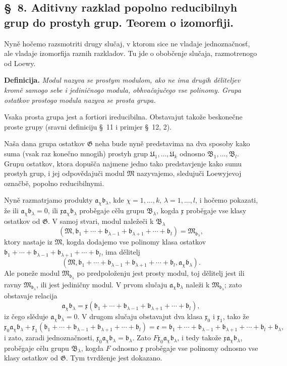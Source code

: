 \documentclass[11pt]{article}
\providecommand{\mM}{\mathfrak M}
\providecommand{\mG}{\mathfrak G}
\providecommand{\mU}{\mathfrak U}
\providecommand{\mB}{\mathfrak B}
\providecommand{\ma}{\mathfrak a}
\providecommand{\mb}{\mathfrak b}
\providecommand{\me}{\mathfrak e}
\providecommand{\mx}{\mathfrak x}
\begin{document}

\setcounter{footnote}{16}
\subsection*{\S~8. Aditivny razklad popolno reducibilnyh grup do prostyh grup. Teorem o izomorfiji.}

Nyně hočemo razsmotriti drugy slučaj, v ktorom sice ne vladaje jednoznačnosť, ale vladaje izomorfija raznih razkladov. Tu jde o obobčenje slučaja, razmotrenogo od Loewy.

\textbf{Definicija.} \textit{Modul nazyva se prostym modulom, ako ne ima drugih děliteljev kromě samogo sebe i jediničnogo modula, obhvačajučego vse polinomy. Grupa ostatkov prostogo modula nazyva se prosta grupa.}

Vsaka prosta grupa jest a fortiori ireducibilna. Obstavajut takože beskonečne proste grupy (sravni definiciju \S~11 i primjer \S~12, 2).

Naša dana grupa ostatkov \(\mG\) neha bude nyně predstavima na dva sposoby kako suma (vsak raz konečno mnogih) prostyh grup \(\mU_1,\ldots,\mU_k\) odnosno \(\mB_1,\ldots,\mB_l\). Grupu ostatkov, ktora dopušča najmene jedno tako predstavjenje kako sumu prostyh grup, i jej odpovědajuči modul \(\mM\) nazyvajemo, sledujuči Loewyjevoj označbě, popolno reducibilnymi.

Nyně razmatrjamo produkty \(\ma_\chi\mb_\lambda\), kde \(\chi=1,\ldots,k\), \(\lambda=1,\ldots,l\), i hočemo pokazati, že ili \(\ma_\chi\mb_\lambda=0\), ili \(\mx\ma_\chi\mb_\lambda\) proběgaje cělu grupu \(\mB_\lambda\), kogda \(\mx\) proběgaje vse klasy ostatkov od \(\mG\). V samoj stvari, modul naležeči k \(\mB_\lambda\)
\[
 (\mM,\mb_1+\cdots+\mb_{\lambda-1}+\mb_{\lambda+1}+\cdots+\mb_l)=\mM_{\mb_\lambda},
\]
ktory nastaje iz \(\mM\), kogda dodajemo vse polinomy klasa ostatkov \(\mb_1+
\cdots+\mb_{\lambda-1}+\mb_{\lambda+1}+\cdots+\mb_l\), ima dělitelj
\[
 (\mM,\mb_1+\cdots+\mb_{\lambda-1}+\mb_{\lambda+1}+\cdots+\mb_l,
 \ma_\chi\mb_\lambda).
\]
Ale poneže modul \(\mM_{\mb_\lambda}\) po predpoloženju jest prosty modul, toj dělitelj jest ili ravny \(\mM_{\mb_\lambda}\), ili jest jediničny modul. V prvom slučaju \(\ma_\chi\mb_\lambda\) naleži k \(\mM_{\mb_\lambda}\); zato obstavaje relacija
\[
 \ma_\chi\mb_\lambda=\mx(\mb_1+
\cdots+\mb_{\lambda-1}+\mb_{\lambda+1}+\cdots+\mb_l),
\]
iz čego slěduje \(\ma_\chi\mb_\lambda=0\). V drugom slučaju obstavajut dva klasa \(\mx_0\) i \(\mx_1\), tako že
\[
 \mx_0\ma_\chi\mb_\lambda
 +\mx_1(\mb_1+\cdots+\mb_{\lambda-1}+\mb_{\lambda+1}+\cdots+\mb_l)
 =\me=\mb_1+\cdots+\mb_{\lambda-1}+\mb_{\lambda+1}+\cdots+\mb_l+\mb_\lambda,
\]
i zato, zaradi jednoznačnosti, \(\mx_0\ma_\chi\mb_\lambda=\mb_\lambda\). Zato \(F\mx_0\ma_\chi\mb_\lambda\), i tedy takože \(\mx\ma_\chi\mb_\lambda\), proběgaje cělu grupu \(\mB_\lambda\), kogda \(F\) odnosno \(\mx\) proběgaje vse polinomy odnosno vse klasy ostatkov od \(\mG\). Tym tvrdženje jest dokazano.
\end{document}
